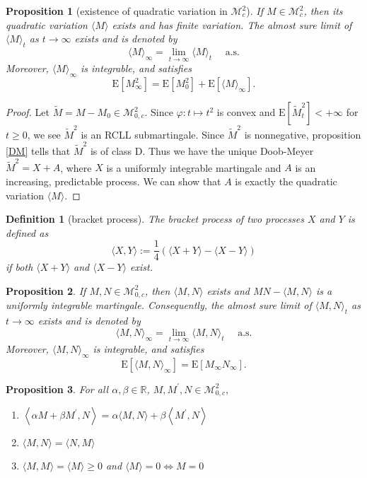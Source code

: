 \documentclass{report}
\newtheorem{definition}{Definition}[section]
\newtheorem{proposition}{Proposition}[section]
\theoremstyle{nonumberplain}
\newtheorem{proof}{Proof.}
\begin{document}
\begin{proposition}[existence of quadratic variation in $\mathscr{M}^2_{c}$]
	If $M\in \mathscr{M}^2_{c}$, then its quadratic variation $\langle M\rangle$ exists and has finite variation. The almost sure limit of $\langle M\rangle_{t}$ as $t \rightarrow \infty$ exists and is denoted by
	\[
	\langle M\rangle_{\infty}=\lim_{t\to\infty}\langle M\rangle_{t}\quad\text{ a.s.}
	\]
	Moreover, $\langle M\rangle_{\infty}$ is integrable, and satisfies
	\[
	\mathrm{E}\left[M_{\infty}^2\right]=\mathrm{E}\left[M_{0}^{2}\right]+\mathrm{E}\left[\langle M\rangle_{\infty}\right].
	\]
\end{proposition}
\begin{proof}
	Let $\widetilde{M}=M-M_0\in\mathscr{M}^2_{0,c}$. Since $\varphi:t\mapsto t^2$ is convex and $\mathrm{E}\left[\widetilde{M}^2_t\right]<+\infty$ for $t\ge0$, we see $\widetilde{M}^2$ is an RCLL submartingale. Since $\widetilde{M}^2$ is nonnegative, proposition \ref{DM} tells that $\widetilde{M}^2$ is of class D. Thus we have the unique Doob-Meyer $\widetilde{M}^2=X+A$, where $X$ is a uniformly integrable martingale and $A$ is an increasing, predictable process. We can show that $A$ is exactly the quadratic variation $\langle M\rangle$.
\end{proof}


\begin{definition}[bracket process]	
	The \emph{bracket process} of two processes $X$ and $Y$ is defined as
	\[
	\langle X, Y\rangle:=\frac{1}{4}\left(\langle X+Y\rangle-\langle X-Y\rangle\right)
	\] 
	if both $\langle X+Y\rangle$ and $\langle X-Y\rangle$ exist.
\end{definition}

\begin{proposition}
	If $M,N\in\mathscr{M}^2_{0,c}$, then $\langle M, N\rangle$ exists and $MN-\langle M, N\rangle$ is a uniformly integrable martingale. Consequently, the almost sure limit of $\langle M, N\rangle_{t}$ as $t \rightarrow \infty$ exists and is denoted by
	\[
	\langle M, N\rangle_{\infty}=\lim_{t\to\infty}\langle M, N\rangle_{t}\quad\text{ a.s.}
	\]
	Moreover, $\langle M, N\rangle_{\infty}$ is integrable, and satisfies
	\[
	\mathrm{E}\left[\langle M, N\rangle_{\infty}\right]=\mathrm{E}\left[M_{\infty} N_{\infty}\right].
	\]
\end{proposition}

\begin{proposition}
For all $\alpha, \beta \in \mathbb{R}$, $M, M^{\prime}, N \in \mathscr{M}^2_{0,c},$

\begin{enumerate}
	\item $\left\langle\alpha M+\beta M^{\prime}, N\right\rangle=\alpha\langle M, N\rangle+\beta\left\langle M^{\prime}, N\right\rangle$
	\item$\langle M, N\rangle=\langle N, M\rangle$
	\item$\langle M, M\rangle=\langle M\rangle \geq 0$ and $\langle M\rangle= 0 \iff M=0$
\end{enumerate}
\end{proposition}
\end{document}
